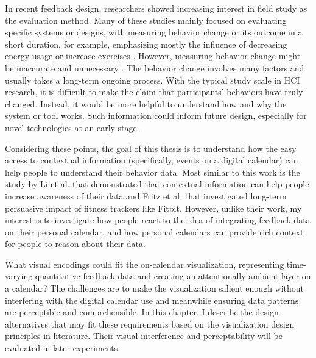 \documentclass[12pt,oneside]{book}
\begin{document}
In recent feedback design, researchers showed increasing interest in field study as the evaluation method.  Many of these studies mainly focused on evaluating specific systems or designs, with measuring behavior change or its outcome in a short duration, for example, emphasizing mostly the influence of decreasing energy usage or increase exercises \cite{kuznetsov_upstream:_2010, thieme_weve_2012,consolvo_flowers_2008,lin_fishnsteps:_2006,chiu_playful_2009}.  
However, measuring behavior change might be inaccurate and unnecessary \cite{klasnja_how_2011}.  The behavior change involves many factors and usually takes a long-term ongoing process.  With the typical study scale in HCI research, it is difficult to make the claim that participants' behaviors have truly changed.  Instead, it would be more helpful to understand how and why the system or tool works.  Such information could inform future design, especially for novel technologies at an early stage \cite{strengers_designing_2011,pierce_consideration_2010,costanza_understanding_2012}.

Considering these points, the goal of this thesis is to understand how the easy access to contextual information (specifically, events on a digital calendar) can help people to understand their behavior data.  Most similar to this work is the study by Li et al. \cite{li_using_2012} that demonstrated that contextual information can help people increase awareness of their data and Fritz et al. \cite{fritz_persuasive_2014} that investigated long-term persuasive impact of fitness trackers like Fitbit. 
However, unlike their work, my interest is to investigate how people react to the idea of integrating feedback data on their personal calendar, and how personal calendars can provide rich context for people to reason about their data. 



\label{chap:visdesign}
What visual encodings could fit the on-calendar visualization, representing time-varying quantitative feedback data and creating an attentionally ambient layer on a calendar?  The challenges are to make the visualization salient enough without interfering with the digital calendar use and meanwhile ensuring data patterns are perceptible and comprehensible.  In this chapter, I describe the design alternatives that may fit these requirements based on the visualization design principles in literature.  Their visual interference and perceptability will be evaluated in later experiments.
\end{document}
